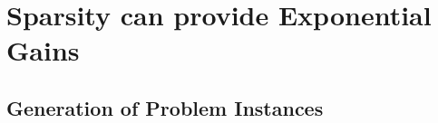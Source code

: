 \section{Sparsity can provide Exponential Gains}
\label{sec:sparse}

\subsection{Generation of Problem Instances}
